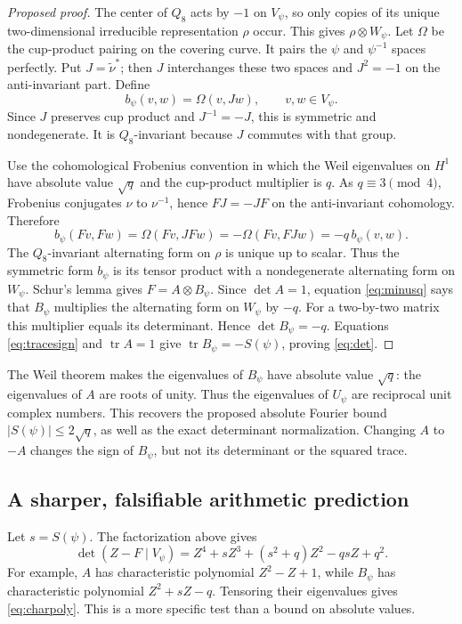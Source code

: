 \documentclass[11pt,a4paper]{article}
\numberwithin{equation}{section}
\newcommand{\tr}{\operatorname{tr}}
\begin{document}
\begin{proof}[Proposed proof]
The center of $Q_8$ acts by $-1$ on $V_\psi$, so only copies of its unique two-dimensional irreducible representation $\rho$ occur. This gives $\rho\otimes W_\psi$. Let $\Omega$ be the cup-product pairing on the covering curve. It pairs the $\psi$ and $\psi^{-1}$ spaces perfectly. Put $J=\widetilde\nu^*$; then $J$ interchanges these two spaces and $J^2=-1$ on the anti-invariant part. Define
\begin{equation}\label{eq:pairing}
 b_\psi(v,w)=\Omega(v,Jw),\qquad v,w\in V_\psi.
\end{equation}
Since $J$ preserves cup product and $J^{-1}=-J$, this is symmetric and nondegenerate. It is $Q_8$-invariant because $J$ commutes with that group.

Use the cohomological Frobenius convention in which the Weil eigenvalues on $H^1$ have absolute value $\sqrt q$ and the cup-product multiplier is $q$. As $q\equiv3\pmod4$, Frobenius conjugates $\nu$ to $\nu^{-1}$, hence $FJ=-JF$ on the anti-invariant cohomology. Therefore
\begin{equation}\label{eq:minusq}
 b_\psi(Fv,Fw)=\Omega(Fv,JFw)
 =-\Omega(Fv,FJw)=-q\,b_\psi(v,w).
\end{equation}
The $Q_8$-invariant alternating form on $\rho$ is unique up to scalar. Thus the symmetric form $b_\psi$ is its tensor product with a nondegenerate alternating form on $W_\psi$. Schur's lemma gives $F=A\otimes B_\psi$. Since $\det A=1$, equation \eqref{eq:minusq} says that $B_\psi$ multiplies the alternating form on $W_\psi$ by $-q$. For a two-by-two matrix this multiplier equals its determinant. Hence $\det B_\psi=-q$. Equations \eqref{eq:tracesign} and $\tr A=1$ give $\tr B_\psi=-S(\psi)$, proving \eqref{eq:det}.
\end{proof}
The Weil theorem makes the eigenvalues of $B_\psi$ have absolute value $\sqrt q$: the eigenvalues of $A$ are roots of unity. Thus the eigenvalues of $U_\psi$ are reciprocal unit complex numbers. This recovers the proposed absolute Fourier bound $|S(\psi)|\le2\sqrt q$, as well as the exact determinant normalization. Changing $A$ to $-A$ changes the sign of $B_\psi$, but not its determinant or the squared trace.

\subsection{A sharper, falsifiable arithmetic prediction}
Let $s=S(\psi)$. The factorization above gives
\begin{equation}\label{eq:charpoly}
 \boxed{\det(Z-F\mid V_\psi)
 =Z^4+sZ^3+(s^2+q)Z^2-qsZ+q^2.}
\end{equation}
For example, $A$ has characteristic polynomial $Z^2-Z+1$, while $B_\psi$ has characteristic polynomial $Z^2+sZ-q$. Tensoring their eigenvalues gives \eqref{eq:charpoly}. This is a more specific test than a bound on absolute values.
\end{document}
